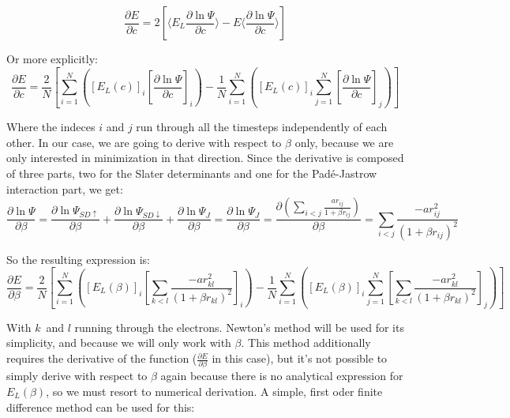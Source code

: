 		\begin{equation}\frac{\partial E}{\partial c}=2\left[\langle E_L\frac{\partial\ln{\Psi}}{\partial c}\rangle-E\langle\frac{\partial\ln{\Psi}}{\partial c}\rangle\right]\end{equation}

		Or more explicitly:\\

		\begin{equation}\frac{\partial E}{\partial c}=\frac{2}{N}\left[\sum_{i=1}^N\left(\left[E_L\left(c\right)\right]_i\left[\frac{\partial\ln{\Psi}}{\partial c}\right]_i\right)-\frac{1}{N}\sum_{i=1}^N\left(\left[E_L\left(c\right)\right]_i\sum_{j=1}^N\left[\frac{\partial\ln{\Psi}}{\partial c}\right]_j\right)\right]\end{equation}

		Where the indeces $i$ and $j$ run through all the timesteps independently of each other. In our case, we are going to derive with respect to $\beta$ only, because we are only interested in minimization in that direction. Since the derivative is composed of three parts, two for the Slater determinants and one for the Padé-Jastrow interaction part, we get:\\

		\begin{equation}\frac{\partial\ln{\Psi}}{\partial\beta}=\frac{\partial\ln{\Psi_{SD\uparrow}}}{\partial\beta}+\frac{\partial\ln{\Psi_{SD\downarrow}}}{\partial\beta}+\frac{\partial\ln{\Psi_J}}{\partial\beta}=\frac{\partial\ln{\Psi_J}}{\partial\beta}=\frac{\partial\left(\sum_{i<j}\frac{ar_{ij}}{1+\beta r_{ij}}\right)}{\partial\beta}=\sum_{i<j}\frac{-ar_{ij}^2}{\left(1+\beta r_{ij}\right)^2}\end{equation}

		So the resulting expression is:\\

		\begin{equation}\frac{\partial E}{\partial\beta}=\frac{2}{N}\left[\sum_{i=1}^N\left(\left[E_L\left(\beta\right)\right]_i\left[\sum_{k<l}\frac{-ar_{kl}^2}{\left(1+\beta r_{kl}\right)^2}\right]_i\right)-\frac{1}{N}\sum_{i=1}^N\left(\left[E_L\left(\beta\right)\right]_i\sum_{j=1}^N\left[\sum_{k<l}\frac{-ar_{kl}^2}{\left(1+\beta r_{kl}\right)^2}\right]_j\right)\right]\end{equation}

		With $k$ and $l$ running through the electrons. Newton's method will be used for its simplicity, and because we will only work with $\beta$. This method additionally requires the derivative of the function ($\frac{\partial E}{\partial\beta}$ in this case), but it's not possible to simply derive with respect to $\beta$ again because there is no analytical expression for $E_L\left(\beta\right)$, so we must resort to numerical derivation. A simple, first oder finite difference method can be used for this:\\

